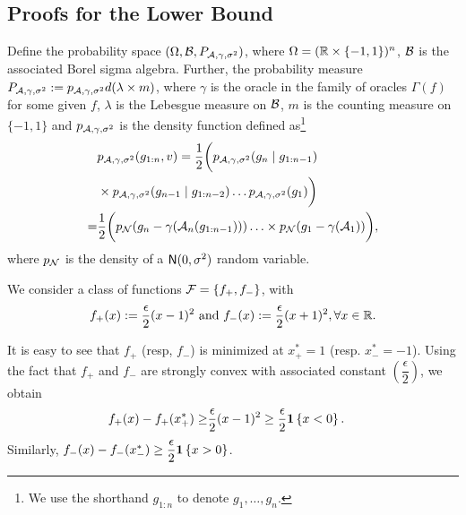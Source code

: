 \subsection{Proofs for the Lower Bound}
\label{sec:lb-proof}

Define the probability space $(\Omega, \mathcal{B}, P_{\mathcal{A},\gamma,\sigma^2})$, where $\Omega = (\mathbb{R}\times \{-1,1\})^n$, $\mathcal{B}$ is the associated Borel sigma algebra. Further, the probability measure $P_{\mathcal{A},\gamma,\sigma^2} := p_{\mathcal{A},\gamma,\sigma^2} d(\lambda \times m)$, where $\gamma$ is the oracle in the family of oracles $\Gamma(f)$ for some given $f$, $\lambda$ is the Lebesgue measure on $\mathcal{B}$, $m$ is the counting measure on $\{-1,1\}$ and $p_{\mathcal{A},\gamma,\sigma^2}$ is the density function defined as\footnote{We use the shorthand $g_{1:n}$ to denote $g_1,\ldots,g_n$.}
\begin{align*}
&p_{\mathcal{A},\gamma,\sigma^2}(g_{1:n}, v) = \dfrac{1}{2} \bigg(p_{\mathcal{A},\gamma,\sigma^2}(g_n \mid g_{1:n-1}) \\
&\times p_{\mathcal{A},\gamma,\sigma^2}(g_{n-1} \mid g_{1:n-2}) \ldots p_{\mathcal{A},\gamma,\sigma^2}(g_1)\bigg)\\
 = & \dfrac{1}{2} \bigg( p_{\mathcal{N}}(g_n - \gamma(\mathcal{A}_n(g_{1:n-1})))
 \ldots \times  p_{\mathcal{N}}(g_1 - \gamma(\mathcal{A}_1))\bigg),
\end{align*}
where $p_{\mathcal{N}}$ is the density of a $\mathsf{N}(0,\sigma^2)$ random variable.  


We consider a class of functions $\mathcal{F} = \{f_+, f_-\}$, with 
\begin{align*}
  f_+(x) := \dfrac{\epsilon}{2} (x - 1)^2 \text{ and } f_-(x) := \dfrac{\epsilon}{2} (x + 1)^2, \forall x \in \mathbb{R}.
\end{align*}

It is easy to see that $f_+$ (resp, $f_-$) is minimized at $x^*_+ = 1$ (resp. $x^*_- = -1$). 
Using the fact that $f_+$ and $f_-$ are strongly convex with associated constant $\left(\dfrac{\epsilon}{2}\right)$, we obtain
\begin{align}
  f_+(x) - f_+(x^*_+)
  \ge &  \dfrac{\epsilon}{2} (x - 1)^2 \ge  \dfrac{\epsilon}{2}  \mathbf{1}\left\{x  < 0\right\}. \label{eq:fv-lb}
\end{align}
Similarly,   $f_-(x) - f_-(x^*_-) \ge  \dfrac{\epsilon}{2}  \mathbf{1}\left\{x  >0\right\}$.

